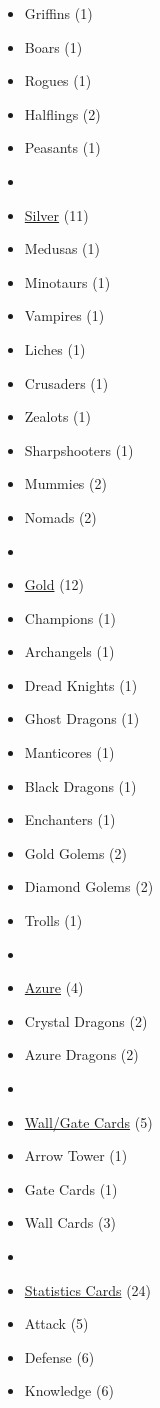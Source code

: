 \begin{multicols}{3}
\begin{itemize}[leftmargin=0pt, label={}, noitemsep, noitemsep]
  \item Griffins (1)
  \item Boars (1)
  \item Rogues (1)
  \item Halflings (2)
  \item Peasants (1)
  \item
  \item \underline{Silver} (11)
  \item Medusas (1)
  \item Minotaurs (1)
  \item Vampires (1)
  \item Liches (1)
  \item Crusaders (1)
  \item Zealots (1)
  \item Sharpshooters (1)
  \item Mummies (2)
  \item Nomads (2)
  \item
  \item \underline{Gold} (12)
  \item Champions (1)
  \item Archangels (1)
  \item Dread Knights (1)
  \item Ghost Dragons (1)
  \item Manticores (1)
  \item Black Dragons (1)
  \item Enchanters (1)
  \item Gold Golems (2)
  \item Diamond Golems (2)
  \item Trolls (1)
  \item
  \item \underline{Azure} (4)
  \item Crystal Dragons (2)
  \item Azure Dragons (2)
  \item
  \item \underline{Wall/Gate Cards} (5)
  \item Arrow Tower (1)
  \item Gate Cards (1)
  \item Wall Cards (3)
  \item
  \item \underline{Statistics Cards} (24)
  \item Attack (5)
  \item Defense (6)
  \item Knowledge (6)

\end{itemize}
\end{multicols}
